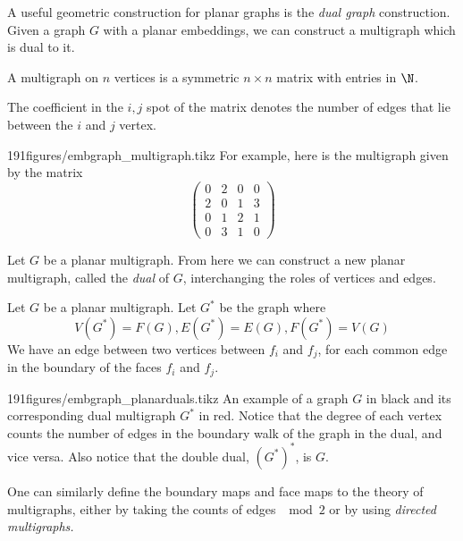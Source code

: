 A useful geometric construction for planar graphs is the \emph{dual graph} construction. Given a graph $G$ with a planar embeddings, we can construct a multigraph which is dual to it. 
\begin{definition}[Multigraph]
 A multigraph on $n$ vertices is a symmetric $n\times n$ matrix with entries in $\N$. 
\end{definition}
The coefficient in the $i,j$ spot of the matrix denotes the number of edges that lie between the $i $ and $j$ vertex. 

\begin{examplefigureenv}{191figures/embgraph_multigraph.tikz}
  For example, here is the multigraph given by the matrix 
\[\begin{pmatrix}
0&2&0&0\\
2&0&1&3\\
0&1&2&1\\
0&3&1&0 \end{pmatrix}\]
\end{examplefigureenv}
Let $G$ be a planar multigraph. From here we can construct a new planar multigraph, called the \emph{dual} of $G$, interchanging the roles of vertices and edges. 
\begin{definition}
Let $G$ be a planar multigraph. Let $G^*$ be the graph where 
\[V(G^*)=F(G), E(G^*)=E(G), F(G^*)=V(G)\]
We have an edge between two vertices between $f_i$ and $f_j$, for each common edge in the boundary of the faces $f_i$ and $f_j$.
\label{def:dualgraph}
\end{definition}
\begin{examplefigureenv}{191figures/embgraph_planarduals.tikz}
  An example of a graph $G$ in black and its corresponding dual multigraph $G^*$ in red. Notice that the degree of each vertex counts the number of edges in the boundary walk of the graph in the dual, and vice versa. Also notice that the double dual, $(G^*)^*$, is $G$. 
\end{examplefigureenv}
One can similarly define the boundary maps and face maps to the theory of multigraphs, either by taking the counts of edges $\mod 2$ or by using \label{proj:dualsandhomology} \emph{directed multigraphs.} 


